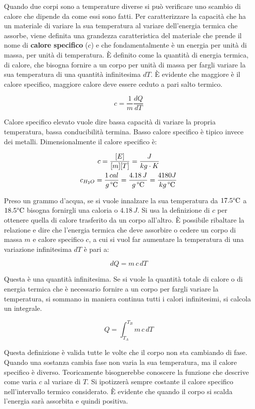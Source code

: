 Quando due corpi sono a temperature diverse si può verificare uno scambio di calore che dipende da come essi sono fatti. Per caratterizzare la capacità che ha un materiale di variare la sua temperatura al variare dell'energia termica che assorbe, viene definita una grandezza caratteristica del materiale che prende il nome di \textbf{calore specifico} ($c$) e che fondamentalmente è un energia per unità di massa, per unità di temperatura. È definito come la quantità di energia termica, di calore, che bisogna fornire a un corpo per unità di massa per fargli variare la sua temperatura di una quantità infinitesima $dT$. È evidente che maggiore è il calore specifico, maggiore calore deve essere ceduto a pari salto termico.

\[
	c = \frac{1}{m} \frac{dQ}{dT}
\]

Calore specifico elevato vuole dire bassa capacità di variare la propria temperatura, bassa conducibilità termina. Basso calore specifico è tipico invece dei metalli. Dimensionalmente il calore specifico è:

\begin{gather*}
	c = \frac{[E]}{[m][T]} = \frac{J}{kg\cdot K} \\
	c_{H_2 O} = \frac{1\,cal }{g\, \degree \text{C} } = \frac{4.18 \, J}{g\, \degree \text{C}} = \frac{4180J}{kg\, \degree \text{C}}
\end{gather*}

Preso un grammo d'acqua, se si vuole innalzare la sua temperatura da $17.5 \degree \text{C}$ a $18.5 \degree \text{C}$ bisogna fornirgli una caloria o $4.18 \, J$.
Si usa la definizione di $c$ per ottenere quella di calore trasferito da un corpo all'altro. È possibile ribaltare la relazione e dire che l'energia termica che deve assorbire o cedere un corpo di massa $m$ e calore specifico $c$, a cui si vuol far aumentare la temperatura di una variazione infinitesima $dT$ è pari a:

\[
	dQ = m\,c\,dT
\]

Questa è una quantità infinitesima. Se si vuole la quantità totale di calore o di energia termica che è necessario fornire a un corpo per fargli variare la temperatura, si sommano in maniera continua tutti i calori infinitesimi, si calcola un integrale.

\[
	Q = \int_{T_A}^{T_B} m\,c\,dT
\]

Questa definizione è valida tutte le volte che il corpo non sta cambiando di fase. Quando una sostanza cambia fase non varia la sua temperatura, ma il calore specifico è diverso. Teoricamente bisognerebbe conoscere la funzione che descrive come varia $c$ al variare di $T$. Si ipotizzerà sempre costante il calore specifico nell'intervallo termico considerato. È evidente che quando il corpo si scalda l'energia sarà assorbita e quindi positiva.

